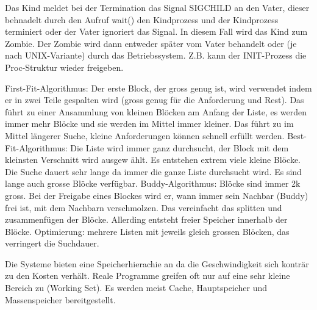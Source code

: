 \begin{answer}
Das Kind meldet bei der Termination das Signal SIGCHILD an den Vater, dieser behnadelt
durch den Aufruf wait() den Kindprozess und der Kindprozess terminiert
oder der Vater ignoriert das Signal. In diesem Fall wird das Kind zum Zombie. Der Zombie
wird dann entweder später vom Vater behandelt oder (je nach UNIX-Variante) durch das
Betriebssystem. Z.B. kann der INIT-Prozess die Proc-Struktur wieder freigeben.
\end{answer}

\begin{answer}
First-Fit-Algorithmus:
Der erste Block, der gross genug ist, wird verwendet indem er in zwei Teile gespalten wird
(gross genug für die Anforderung und Rest).
Das führt zu einer Ansammlung von kleinen Blöcken am Anfang der Liste, es werden immer
mehr Blöcke und sie werden im Mittel immer kleiner. Das führt zu im Mittel längerer
Suche, kleine Anforderungen können schnell erfüllt werden.
Best-Fit-Algorithmus:
Die Liste wird immer ganz durchsucht, der Block mit dem kleinsten Verschnitt wird ausgew
ählt.
Es entstehen extrem viele kleine Blöcke. Die Suche dauert sehr lange da immer die ganze
Liste durchsucht wird. Es sind lange auch grosse Blöcke verfügbar.
Buddy-Algorithmus:
Blöcke sind immer 2k gross. Bei der Freigabe eines Blockes wird er, wann immer sein
Nachbar (Buddy) frei ist, mit dem Nachbarn verschmolzen.
Das vereinfacht das splitten und zusammenfügen der Blöcke. Allerding entsteht freier Speicher
innerhalb der Blöcke.
Optimierung: mehrere Listen mit jeweils gleich grossen Blöcken, das verringert die Suchdauer.
\end{answer}

\begin{answer}
Die Systeme bieten eine Speicherhierachie an da die Geschwindigkeit sich konträr zu den
Kosten verhält. Reale Programme greifen oft nur auf eine sehr kleine Bereich zu (Working Set). Es werden meist Cache, Hauptspeicher und Massenspeicher bereitgestellt.
\end{answer}

